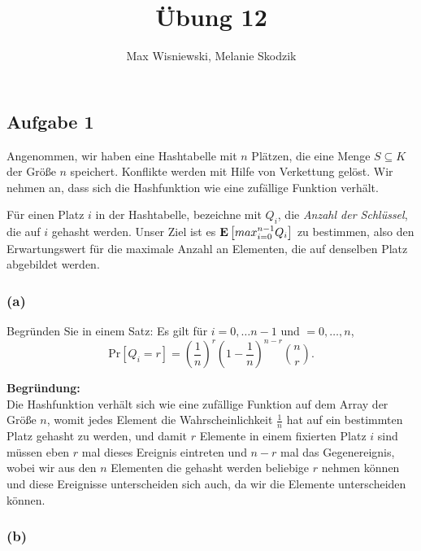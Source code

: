 \documentclass[11pt,a4paper,ngerman]{article}
\date{}
\title{Übung 12}
\author{Max Wisniewski, Melanie Skodzik}
\newcommand{\erw}[1]{\text{\bfseries E} \left[ #1 \right]}
\newcommand{\prob}[1]{\text{Pr}\left[ #1 \right]}
\begin{document}

\renewcommand{\figurename}{Figure}

\maketitle
\thispagestyle{fancy}


\subsection*{Aufgabe 1}

Angenommen, wir haben eine Hashtabelle mit $n$ Plätzen, die eine Menge $S \subseteq K$ der Größe $n$ speichert. Konflikte werden mit Hilfe von Verkettung gelöst. Wir nehmen an, dass sich die Hashfunktion wie eine zufällige Funktion verhält.

Für einen Platz $i$ in der Hashtabelle, bezeichne mit $Q_i$, die \emph{Anzahl der Schlüssel}, die auf $i$ gehasht werden. Unser Ziel ist es 
$\erw{max_{i=0}^{n-1} Q_i}$ zu bestimmen, also den Erwartungswert für die maximale Anzahl an Elementen, die auf denselben Platz abgebildet werden.

\subsubsection*{(a)}

Begründen Sie in einem Satz: Es gilt für $i = 0, \dots n-1$ und $ = 0 , \dots, n$,
$$
	\prob{Q_i = r} = \left(\frac{1}{n} \right)^r \left( 1 - \frac{1}{n}\right)^{n-r} \binom{n}{r}.
$$

\noindent\textbf{Begründung:}\\
Die Hashfunktion verhält sich wie eine zufällige Funktion auf dem Array der Größe $n$, womit jedes Element die Wahrscheinlichkeit $\frac{1}{n}$ hat auf ein bestimmten Platz gehasht zu werden, und damit $r$ Elemente in einem fixierten Platz $i$ sind müssen eben $r$ mal dieses Ereignis eintreten und $n-r$ mal das Gegenereignis, wobei wir aus den $n$ Elementen die gehasht werden beliebige $r$ nehmen können und diese Ereignisse unterscheiden sich auch, da wir die Elemente unterscheiden können.

\subsubsection*{(b)}
\end{document}
